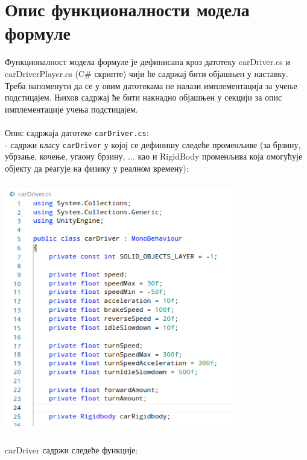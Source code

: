 \documentclass[12pt]{article}
\begin{document}
\section{Опис функционалности модела формуле}
Функционалност модела формуле је дефинисана кроз датотеку carDriver.cs и carDriverPlayer.cs (C\# скрипте) чији ће садржај бити објашњен у наставку. Треба напоменути да се у овим датотекама не налази имплементација за учење подстицајем. Њихов садржај ће бити накнадно објашњен у секцији за опис имплементације учења подстицајем.\\\\
Опис садржаја датотеке \texttt{carDriver.cs}:\\
- садржи класу \texttt{carDriver} у којој се дефинишу следеће променљиве (за брзину, убрзање, кочење, угаону брзину, ... као и RigidBody променљива која омогућује објекту да реагује на физику у реалном времену):
\begin{center}
    \centering 
    \includegraphics[height=11cm, width=10cm]{images/csDriver_fields.png}
\end{center}
\vspace{0.5cm}
 carDriver садржи следеће функције: 
\end{document}
